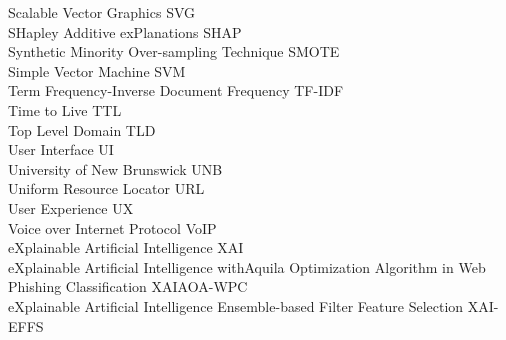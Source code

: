 Scalable Vector Graphics \hfill SVG\\
SHapley Additive exPlanations \hfill SHAP\\
Synthetic Minority Over-sampling Technique \hfill SMOTE\\
Simple Vector Machine \hfill SVM\\
Term Frequency-Inverse Document Frequency \hfill TF-IDF\\
Time to Live \hfill TTL\\
Top Level Domain \hfill TLD\\
User Interface \hfill UI\\
University of New Brunswick \hfill UNB\\
Uniform Resource Locator \hfill URL\\
User Experience \hfill UX\\
Voice over Internet Protocol \hfill VoIP\\
eXplainable Artificial Intelligence \hfill XAI\\
eXplainable Artificial Intelligence with\newline Aquila Optimization Algorithm in Web Phishing Classification \hfill XAIAOA-WPC\\
eXplainable Artificial Intelligence Ensemble-based Filter Feature Selection \hfill XAI-EFFS\\
